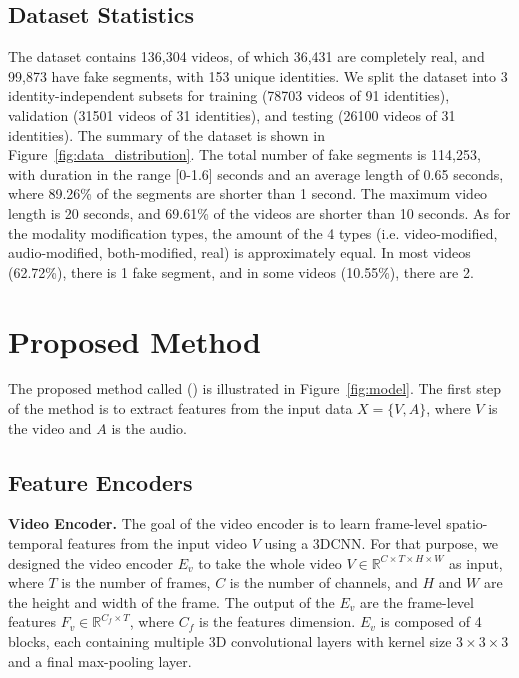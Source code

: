 \documentclass[conference, a4paper]{IEEEtran}
\makeatletter
\newcommand*{\ie}{i.e.\@\xspace}
\makeatother
\begin{document}
\subsection{Dataset Statistics}
The dataset contains 136,304 videos, of which 36,431 are completely real, and 99,873 have fake segments, with 153 unique identities. We split the dataset into 3 identity-independent subsets for training (78703 videos of 91 identities), validation (31501 videos of 31 identities), and testing (26100 videos of 31 identities). The summary of the dataset is shown in Figure~\ref{fig:data_distribution}. The total number of fake segments is 114,253, with duration in the range [0-1.6] seconds and an average length of 0.65 seconds, where 89.26\% of the segments are shorter than 1 second. The maximum video length is 20 seconds, and 69.61\% of the videos are shorter than 10 seconds. As for the modality modification types, the amount of the 4 types (\ie video-modified, audio-modified, both-modified, real) is approximately equal. In most videos (62.72\%), there is 1 fake segment, and in some videos (10.55\%), there are 2. 



\section{Proposed Method}
\label{sec:proposed_method}
The proposed method called \model{} (\modelabbr{}) is illustrated in Figure~\ref{fig:model}. The first step of the method is to extract features from the input data $X = \{V, A\}$, where $V$ is the video and $A$ is the audio.

\subsection{Feature Encoders}
\noindent \textbf{Video Encoder.} The goal of the video encoder is to learn frame-level spatio-temporal features from the input video $V$ using a 3DCNN. For that purpose, we designed the video encoder $E_v$ to take the whole video $V \in \mathbb{R}^{C\times T\times H\times W}$ as input, where $T$ is the number of frames, $C$ is the number of channels, and $H$ and $W$ are the height and width of the frame. The output of the $E_v$ are the frame-level features $F_v \in \mathbb{R}^{C_f \times T}$, where $C_f$ is the features dimension. $E_v$ is composed of 4 blocks, each containing multiple 3D convolutional layers with kernel size $3\times 3\times 3$ and a final max-pooling layer.
\end{document}
